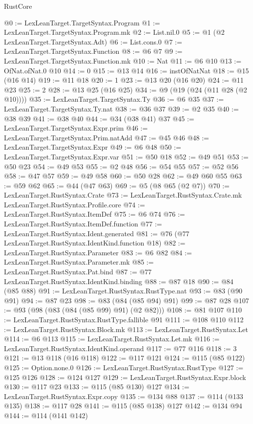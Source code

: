 \begin{lexlean}{RustCore}
\begin{coremodule}
@0 := LexLeanTarget.TargetSyntax.Program
@1 := LexLeanTarget.TargetSyntax.Program.mk
@2 := List.nil.{0}
@5 := @1 (@2 LexLeanTarget.TargetSyntax.Adt)
@6 := List.cons.{0}
@7 := LexLeanTarget.TargetSyntax.Function
@8 := @6 @7
@9 := LexLeanTarget.TargetSyntax.Function.mk
@10 := Nat
@11 := @6 @10
@13 := OfNat.ofNat.{0} @10
@14 := 0
@15 := @13 @14
@16 := instOfNatNat
@18 := @15 (@16 @14)
@19 := @11 @18
@20 := 1
@23 := @13 @20 (@16 @20)
@24 := @11 @23
@25 := 2
@28 := @13 @25 (@16 @25)
@34 := @9 (@19 (@24 (@11 @28 (@2 @10))))
@35 := LexLeanTarget.TargetSyntax.Ty
@36 := @6 @35
@37 := LexLeanTarget.TargetSyntax.Ty.nat
@38 := @36 @37
@39 := @2 @35
@40 := @38 @39
@41 := @38 @40
@44 := @34 (@38 @41) @37
@45 := LexLeanTarget.TargetSyntax.Expr.prim
@46 := LexLeanTarget.TargetSyntax.Prim.natAdd
@47 := @45 @46
@48 := LexLeanTarget.TargetSyntax.Expr
@49 := @6 @48
@50 := LexLeanTarget.TargetSyntax.Expr.var
@51 := @50 @18
@52 := @49 @51
@53 := @50 @23
@54 := @49 @53
@55 := @2 @48
@56 := @54 @55
@57 := @52 @56
@58 := @47 @57
@59 := @49 @58
@60 := @50 @28
@62 := @49 @60 @55
@63 := @59 @62
@65 := @44 (@47 @63)
@69 := @5 (@8 @65 (@2 @7))
@70 := LexLeanTarget.RustSyntax.Crate
@73 := LexLeanTarget.RustSyntax.Crate.mk LexLeanTarget.RustSyntax.Profile.core
@74 := LexLeanTarget.RustSyntax.ItemDef
@75 := @6 @74
@76 := LexLeanTarget.RustSyntax.ItemDef.function
@77 := LexLeanTarget.RustSyntax.Ident.generated
@81 := @76 (@77 LexLeanTarget.RustSyntax.IdentKind.function @18)
@82 := LexLeanTarget.RustSyntax.Parameter
@83 := @6 @82
@84 := LexLeanTarget.RustSyntax.Parameter.mk
@85 := LexLeanTarget.RustSyntax.Pat.bind
@87 := @77 LexLeanTarget.RustSyntax.IdentKind.binding
@88 := @87 @18
@90 := @84 (@85 @88)
@91 := LexLeanTarget.RustSyntax.RustType.nat
@93 := @83 (@90 @91)
@94 := @87 @23
@98 := @83 (@84 (@85 @94) @91)
@99 := @87 @28
@107 := @93 (@98 (@83 (@84 (@85 @99) @91) (@2 @82)))
@108 := @81 @107
@110 := LexLeanTarget.RustSyntax.RustType.fallible @91
@111 := @108 @110
@112 := LexLeanTarget.RustSyntax.Block.mk
@113 := LexLeanTarget.RustSyntax.Let
@114 := @6 @113
@115 := LexLeanTarget.RustSyntax.Let.mk
@116 := LexLeanTarget.RustSyntax.IdentKind.operand
@117 := @77 @116
@118 := 3
@121 := @13 @118 (@16 @118)
@122 := @117 @121
@124 := @115 (@85 @122)
@125 := Option.none.{0}
@126 := LexLeanTarget.RustSyntax.RustType
@127 := @125 @126
@128 := @124 @127
@129 := LexLeanTarget.RustSyntax.Expr.block
@130 := @117 @23
@133 := @115 (@85 @130) @127
@134 := LexLeanTarget.RustSyntax.Expr.copy
@135 := @134 @88
@137 := @114 (@133 @135)
@138 := @117 @28
@141 := @115 (@85 @138) @127
@142 := @134 @94
@144 := @114 (@141 @142)

\end{coremodule}
\end{lexlean}
